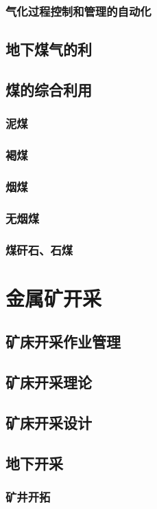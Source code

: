 \documentclass[UTF8]{../../ApplicationUniverse}
\begin{document}
        \subsubsection{气化过程控制和管理的自动化}
    \subsection{地下煤气的利}
    \subsection{煤的综合利用}
        \subsubsection{泥煤}
        \subsubsection{褐煤}
        \subsubsection{烟煤}
        \subsubsection{无烟煤}
        \subsubsection{煤矸石、石煤}
\section{金属矿开采}
    \subsection{矿床开采作业管理}
    \subsection{矿床开采理论}
    \subsection{矿床开采设计}
    \subsection{地下开采}
        \subsubsection{矿井开拓}
\end{document}
